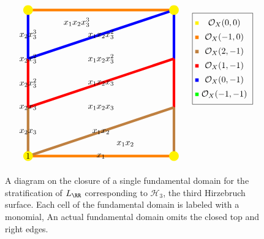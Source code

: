 \documentclass{amsart}
\begin{document}
\begin{example}
\begin{figure}
\[\begin{tikzpicture}[scale=2]
\draw[line width=3pt, brown] (0,0) -- (0,1);
\draw[line width=3pt, red] (0,1) -- (0,2);
\draw[line width=3pt, blue] (0,2)-- (0,3);
\draw[line width=3pt, orange] (0,3) -- (3,3);

\draw[line width=3pt, brown] (3,0) -- (3,1);
\draw[line width=3pt, red] (3,1) -- (3,2);
\draw[line width=3pt, blue] (3,2)-- (3,3);


\draw[line width=3pt, orange] (3,0) -- (0,0);
\draw[line width=3pt, brown] (0,0) -- (3,1);
\draw[line width=3pt, red] (0,1) -- (3,2);
\draw[line width=3pt, blue] (0,2) -- (3,3);


\node[fill, circle, yellow, inner sep = 4pt] at (0,0) {};
\node[fill, circle, yellow, inner sep = 4pt] at (3,0) {};
\node[fill, circle, yellow, inner sep = 4pt] at (3,3) {};
\node[fill, circle, yellow, inner sep = 4pt] at (0,3) {};
\node at (0,0) {$1$};
\node at (0,1) {$x_2x_3$};
\node at (0,2) {$x_2x_3^2$};

\node at (1.5,0) {$x_1$};

\node at (0,0.5) {$x_2x_3$};
\node at (0,1.5) {$x_2x_3^2$};
\node at (0,2.5) {$x_2x_3^3$};


\node at (1.5,0.5) {$x_1x_2$};
\node at (1.5,1.5) {$x_1x_2x_3$};
\node at (1.5,2.5) {$x_1x_2x_3^2$};

\node at (2,0.25) {$x_1x_2$};
\node at (1.5,1) {$x_1x_2x_3$};
\node at (1.5,2) {$x_1x_2x_3^2$};
\node at (1,2.75) {$x_1x_2x_3^3$};

\matrix[draw] at (4,2) {
  \node[fill=yellow,inner sep = 2pt] {}; & \node {$\cO_{X}(0,0)$};\\
  \node[fill=orange,inner sep = 2pt] {}; & \node {$\cO_{X}(-1,0)$};\\
  \node[fill=brown,inner sep = 2pt] {}; & \node {$\cO_{X}(2,-1)$};\\
  \node[fill=red,inner sep = 2pt] {}; & \node {$\cO_{X}(1,-1)$};\\
  \node[fill=blue,inner sep = 2pt] {}; & \node {$\cO_{X}(0,-1)$};\\
  \node[fill=green,inner sep = 2pt] {}; & \node {$\cO_{X}(-1,-1)$};\\
};

\end{tikzpicture}
\]
\caption{A diagram on the closure of a single fundamental domain for the
stratification of $L_\RR$ corresponding to $\mathcal H_3$, the third Hirzebruch surface. Each cell of the fundamental domain is labeled with a monomial, An actual fundamental domain omits the closed top and right edges.}
\label{fig:hirzebruch-stratification}
\end{figure}

\end{example}
\end{document}
